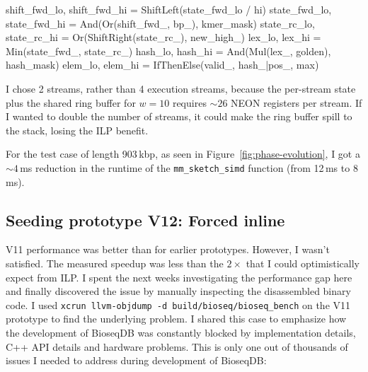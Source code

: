 \begin{BioseqCppSnippet}
shift_fwd_lo, shift_fwd_hi = ShiftLeft(state_fwd_lo / hi)
state_fwd_lo, state_fwd_hi = And(Or(shift_fwd_, bp_), kmer_mask)
state_rc_lo,  state_rc_hi  = Or(ShiftRight(state_rc_), new_high_)
lex_lo,       lex_hi       = Min(state_fwd_, state_rc_)
hash_lo,      hash_hi      = And(Mul(lex_, golden), hash_mask)
elem_lo,      elem_hi      = IfThenElse(valid_, hash_|pos_, max)
\end{BioseqCppSnippet}

I chose 2 streams, rather than 4 execution streams, because the per-stream state plus the shared ring buffer for $w=10$ requires
$\sim 26$ NEON registers per stream. If I wanted to double the number of streams, it could make the ring buffer spill to the stack, losing the ILP benefit.

For the test case of length 903\,kbp, as seen in Figure~\ref{fig:phase-evolution}, I got a $\sim 4$\,ms reduction in the runtime of the
\texttt{mm\_sketch\_simd} function (from 12\,ms to 8\,ms).

\subsection{Seeding prototype V12: Forced inline}

V11 performance was better than for earlier prototypes. However, I wasn't satisfied. The measured speedup was less than the $2\times$ that I could optimistically expect from ILP.
I spent the next weeks investigating the performance gap here and finally discovered the issue by manually inspecting the disassembled binary code.
I used \texttt{xcrun llvm-objdump -d build/bioseq/bioseq\_bench} on the V11
prototype to find the underlying problem. I shared this case to emphasize how the development of BioseqDB was constantly blocked by implementation details, C++ API details and hardware problems. This is only one out of thousands of issues I needed to address during development of BioseqDB:


